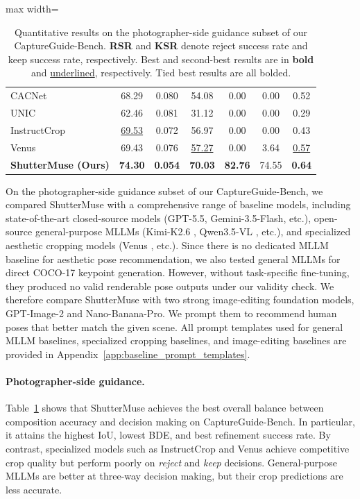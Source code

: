\documentclass{llmxive}
\begin{document}
\begin{table}[!htbp]
\begin{adjustbox}{max width=\linewidth}
\begin{tabular}{l|cccccc}
    \midrule
    CACNet~\cite{hong2021composing} & 68.29 & 0.080 & 54.08 & 0.00 & 0.00 & 0.52 \\
    UNIC~\cite{liu2023beyond} & 62.46 & 0.081 & 31.12 & 0.00 & 0.00 & 0.29 \\
    InstructCrop~\cite{sheng2025instructcrop} & \underline{69.53} & 0.072 & 56.97 & 0.00 & 0.00 & 0.43 \\
    Venus~\cite{du2026venus} & 69.43 & 0.076 & \underline{57.27} & 0.00 & 3.64 & \underline{0.57} \\
    \midrule
    \textbf{ShutterMuse (Ours)} & \textbf{74.30} & \textbf{0.054} & \textbf{70.03} & \textbf{82.76} & 74.55 & \textbf{0.64} \\
    \bottomrule
  \end{tabular}
  \end{adjustbox}
\caption{Quantitative results on the photographer-side guidance subset of our CaptureGuide-Bench. \textbf{RSR} and \textbf{KSR} denote reject success rate and keep success rate, respectively. Best and second-best results are in \textbf{bold} and \underline{underlined}, respectively. Tied best results are all bolded.}
\label{tab:photographer_side_bench}
\end{table}
On the photographer-side guidance subset of our CaptureGuide-Bench, we compared ShutterMuse with a comprehensive range of baseline models, including state-of-the-art closed-source models (GPT-5.5, Gemini-3.5-Flash, etc.), open-source general-purpose MLLMs (Kimi-K2.6 \cite{moonshotai2025kimik26}, Qwen3.5-VL \citep{qwen35blog}, etc.), and specialized aesthetic cropping models (Venus \citep{du2026venus}, etc.). Since there is no dedicated MLLM baseline for aesthetic pose recommendation, we also tested general MLLMs for direct COCO-17 keypoint generation. However, without task-specific fine-tuning, they produced no valid renderable pose outputs under our validity check. We therefore compare ShutterMuse with two strong image-editing foundation models, GPT-Image-2 and
Nano-Banana-Pro. We prompt them to recommend human poses that better match the given scene. All prompt templates used for general MLLM baselines, specialized cropping baselines, and image-editing baselines are provided in Appendix~\ref{app:baseline_prompt_templates}.


\paragraph{Photographer-side guidance.}
Table~\ref{tab:photographer_side_bench} shows that ShutterMuse achieves the best overall balance between composition accuracy and decision making on CaptureGuide-Bench. In particular, it attains the highest IoU, lowest BDE, and best refinement success rate. By contrast, specialized models such as InstructCrop and Venus achieve competitive crop quality but perform poorly on \textit{reject} and \textit{keep} decisions. General-purpose MLLMs are better at three-way decision making, but their crop predictions are less accurate.
\end{document}
